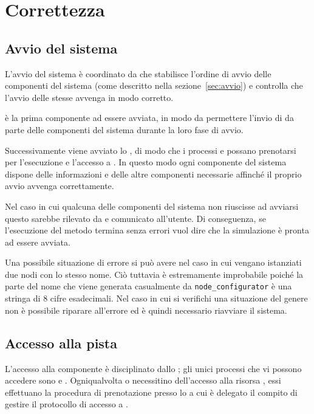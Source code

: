 \chapter{Correttezza}
\label{ch:correttezza}

\section{Avvio del sistema}
L'avvio del sistema è coordinato da \bootserv{} che stabilisce l'ordine di avvio delle componenti del sistema (come descritto nella sezione~\ref{sec:avvio}) e controlla che l'avvio delle stesse avvenga in modo corretto.

\evdisp{} è la prima componente ad essere avviata, in modo da permettere l'invio di  da parte delle componenti del sistema durante la loro fase di avvio.

Successivamente viene avviato lo \sched{}, di modo che i processi \weather{} e \car{} possano prenotarsi per l'esecuzione e l'accesso a \track{}. In questo modo ogni componente del sistema dispone delle informazioni e delle altre componenti necessarie affinché il proprio avvio avvenga correttamente.

Nel caso in cui qualcuna delle componenti del sistema non riuscisse ad avviarsi questo sarebbe rilevato da \bootserv{} e comunicato all'utente. Di conseguenza, se l'esecuzione del metodo  termina senza errori vuol dire che la simulazione è pronta ad essere avviata.

Una possibile situazione di errore si può avere nel caso in cui vengano istanziati due nodi \Erlang{} con lo stesso nome. Ciò tuttavia è estremamente improbabile poiché la parte del nome che viene generata casualmente da \texttt{node\_configurator} è una stringa di 8 cifre esadecimali. Nel caso in cui si verifichi una situazione del genere non è possibile riparare all'errore ed è quindi necessario riavviare il sistema.

\section{Accesso alla pista}
L'accesso alla componente \track{} è disciplinato dallo \sched{}; gli unici processi che vi possono accedere sono \car{} e \weather{}. Ogniqualvolta \car{} o \weather{} necessitino dell'accesso alla risorsa \track{}, essi effettuano la procedura di prenotazione presso lo \sched{} a cui è delegato il compito di gestire il protocollo di accesso a \track{}.

